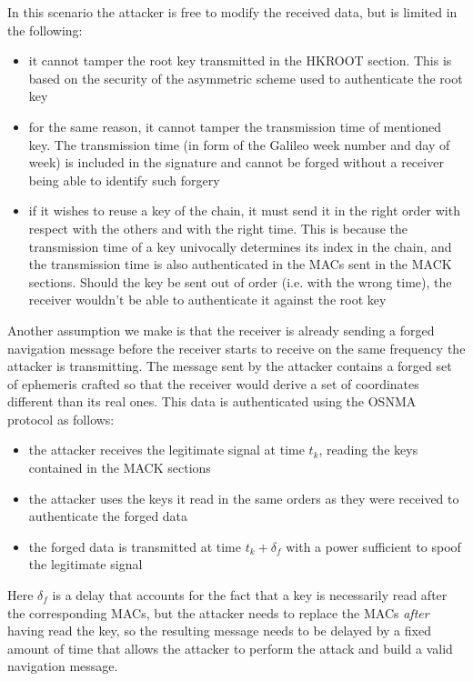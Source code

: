 In this scenario the attacker is free to modify the received data, but is
limited in the following:
\begin{itemize}
  \item it cannot tamper the root key transmitted in the HKROOT section. This is
    based on the security of the asymmetric scheme used to authenticate the root
    key
  \item for the same reason, it cannot tamper the transmission time of mentioned
    key. The transmission time (in form of the Galileo week number and day of
    week) is included in the signature and cannot be forged without a receiver
    being able to identify such forgery
  \item if it wishes to reuse a key of the chain, it must send it in the right
    order with respect with the others and with the right time. This is because
    the transmission time of a key univocally determines its index in the chain,
    and the transmission time is also authenticated in the MACs sent in the
    MACK sections. Should the key be sent out of order (i.e. with the wrong
    time), the receiver wouldn't be able to authenticate it against the root key
\end{itemize}

Another assumption we make is that the receiver is already sending a forged
navigation message before the receiver starts to receive on the same frequency
the attacker is transmitting. The message sent by the attacker contains a forged
set of ephemeris crafted so that the receiver would derive a set of coordinates
different than its real ones. This data is authenticated using the OSNMA
protocol as follows:
\begin{itemize}
  \item the attacker receives the legitimate signal at time $t_k$, reading the
    keys contained in the MACK sections
  \item the attacker uses the keys it read in the same orders as they were
    received to authenticate the forged data
  \item the forged data is transmitted at time $t_k + \delta_f$ with a power
    sufficient to spoof the legitimate signal
\end{itemize}

Here $\delta_f$ is a delay that accounts for the fact that a key is necessarily
read after the corresponding MACs, but the attacker needs to replace the MACs
\textit{after} having read the key, so the resulting message needs to be delayed
by a fixed amount of time that allows the attacker to perform the attack and
build a valid navigation message.


